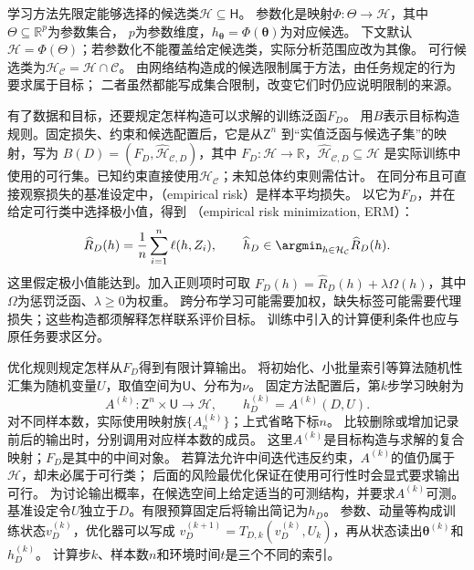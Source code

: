 学习方法先限定能够选择的候选类$\mathcal H\subseteq\mathsf H$。
参数化是映射$\Phi:\Theta\to\mathcal H$，其中$\Theta\subseteq\mathbb R^p$为参数集合，
$p$为参数维度，$h_{\bm\theta}=\Phi(\bm\theta)$为对应候选。
下文默认$\mathcal H=\Phi(\Theta)$；若参数化不能覆盖给定候选类，实际分析范围应改为其像。
可行候选类为$\mathcal H_{\mathcal C}=\mathcal H\cap\mathcal C$。
由网络结构造成的候选限制属于方法，由任务规定的行为要求属于目标；
二者虽然都能写成集合限制，改变它们时仍应说明限制的来源。

有了数据和目标，还要规定怎样构造可以求解的训练泛函$F_D$。
用$B$表示目标构造规则。固定损失、约束和候选配置后，它是从$\mathsf Z^n$
到“实值泛函与候选子集”的映射，写为
$B(D)=(F_D,\widehat{\mathcal H}_{\mathcal C,D})$，其中
$F_D:\mathcal H\to\mathbb R$，$\widehat{\mathcal H}_{\mathcal C,D}\subseteq\mathcal H$
是实际训练中使用的可行集。已知约束直接使用$\mathcal H_{\mathcal C}$；未知总体约束则需估计。
在同分布且可直接观察损失的基准设定中，（empirical risk）是样本平均损失。
以它为$F_D$，并在给定可行类中选择极小值，得到
（empirical risk minimization, ERM）：
\begin{equation}
  \widehat R_D(h)=\frac1n\sum_{i=1}^n\ell(h,Z_i),\qquad
  \widehat h_D\in\argmin_{h\in\mathcal H_{\mathcal C}}\widehat R_D(h).
  \label{eq:future-unified-empirical-problem}
\end{equation}
这里假定极小值能达到。加入正则项时可取
$F_D(h)=\widehat R_D(h)+\lambda\Omega(h)$，其中$\Omega$为惩罚泛函、$\lambda\geq0$为权重。
跨分布学习可能需要加权，缺失标签可能需要代理损失；这些构造都须解释怎样联系评价目标。
训练中引入的计算便利条件也应与原任务要求区分。

优化规则规定怎样从$F_D$得到有限计算输出。
将初始化、小批量索引等算法随机性汇集为随机变量$U$，取值空间为$\mathsf U$、分布为$\nu$。
固定方法配置后，第$k$步学习映射为
\begin{equation}
  A^{(k)}:\mathsf Z^n\times\mathsf U\to\mathcal H,
  \qquad h_D^{(k)}=A^{(k)}(D,U).
  \label{eq:future-learning-algorithm-output}
\end{equation}
对不同样本数，实际使用映射族$\{A_n^{(k)}\}$；上式省略下标$n$。
比较删除或增加记录前后的输出时，分别调用对应样本数的成员。
这里$A^{(k)}$是目标构造与求解的复合映射；$F_D$是其中的中间对象。
若算法允许中间迭代违反约束，$A^{(k)}$的值仍属于$\mathcal H$，却未必属于可行类；
后面的风险最优化保证在使用可行性时会显式要求输出可行。
为讨论输出概率，在候选空间上给定适当的可测结构，并要求$A^{(k)}$可测。
基准设定令$U$独立于$D$。有限预算固定后将输出简记为$h_D$。
参数、动量等构成训练状态$v_D^{(k)}$，优化器可以写成
$v_D^{(k+1)}=T_{D,k}(v_D^{(k)},U_k)$，再从状态读出$\bm\theta^{(k)}$和$h_D^{(k)}$。
计算步$k$、样本数$n$和环境时间$t$是三个不同的索引。

